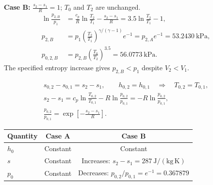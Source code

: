 \textbf{Case B:} $\displaystyle\frac{s_2-s_1}{R}=1$;
$T_0$ and $T_2$ are unchanged.
\begin{align*}
\ln\frac{p_{2,B}}{p_1}
&=\frac{c_p}{R}\ln\frac{T_2}{T_1}-\frac{s_2-s_1}{R}
=3.5\ln\frac{T_2}{T_1}-1,\\
p_{2,B}&=p_1\left(\frac{T_2}{T_1}\right)^{\gamma/(\gamma-1)}e^{-1}
=p_{2,A}e^{-1}
=\boxed{53.2430~\mathrm{kPa}},\\
p_{0,2,B}&=p_{2,B}\left(\frac{T_0}{T_2}\right)^{3.5}
=\boxed{56.0773~\mathrm{kPa}}.
\end{align*}
The specified entropy increase gives $p_{2,B}<p_1$ despite $V_2<V_1$.

\begin{gather*}
s_{0,2}-s_{0,1}=s_2-s_1,\qquad
h_{0,2}=h_{0,1}\quad\Longrightarrow\quad T_{0,2}=T_{0,1},\\
s_2-s_1=c_p\ln\frac{T_{0,2}}{T_{0,1}}
-R\ln\frac{p_{0,2}}{p_{0,1}}
=-R\ln\frac{p_{0,2}}{p_{0,1}},\\
\boxed{\frac{p_{0,2}}{p_{0,1}}
=\exp\left[-\frac{s_2-s_1}{R}\right]}.
\end{gather*}

\begin{center}
\begin{tabular}{lcc}
\hline
Quantity & Case A & Case B \\
\hline
$h_0$ & Constant & Constant \\
$s$ & Constant & Increases: $s_2-s_1=287~\mathrm{J/(kg\,K)}$ \\
$p_0$ & Constant & Decreases: $p_{0,2}/p_{0,1}=e^{-1}=0.367879$ \\
\hline
\end{tabular}
\end{center}
